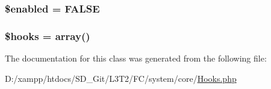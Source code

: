\subsubsection[{\$enabled}]{\setlength{\rightskip}{0pt plus 5cm}\$enabled = F\+A\+L\+S\+E}\label{class_c_i___hooks_a8d376199cc641e3e7af6e1a0d5c736d9}
\hypertarget{class_c_i___hooks_a05aec88c3516c6db5da524fbcc673aff}{}
\subsubsection[{\$hooks}]{\setlength{\rightskip}{0pt plus 5cm}\$hooks = array()}\label{class_c_i___hooks_a05aec88c3516c6db5da524fbcc673aff}


The documentation for this class was generated from the following file\+:\begin{DoxyCompactItemize}
\item 
D\+:/xampp/htdocs/\+S\+D\+\_\+\+Git/\+L3\+T2/\+F\+C/system/core/\hyperlink{system_2core_2hooks_8php}{Hooks.\+php}\end{DoxyCompactItemize}
